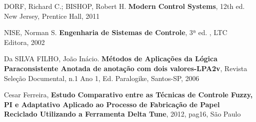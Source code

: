 \documentclass[12pt,a4paper]{report}
\begin{document}














\begin{thebibliography}{9}


	DORF, Richard C.; BISHOP, Robert H.
	\textbf{Modern Control Systems},
	12th ed.
	New Jersey, 
	Prentice Hall,
	2011


	NISE, Norman S.
	\textbf{Engenharia de Sistemas de Controle},
	3ª ed. ,
	LTC Editora,
	2002

	Da SILVA FILHO, João Inácio.
	\textbf{Métodos de Aplicações da Lógica Paraconsistente Anotada de anotação com dois valores-LPA2v},
	Revista Seleção Documental,
	n.1 Ano 1,
	Ed. Paralogike,
	Santos-SP,
	2006


	Cesar Ferreira,
	\textbf{Estudo Comparativo entre as Técnicas de 		Controle Fuzzy, PI e Adaptativo Aplicado ao 			Processo de Fabricação de Papel Reciclado 			Utilizando a Ferramenta Delta Tune},
	2012,
	pag16,
	São Paulo



\end{thebibliography}


\end{document}

